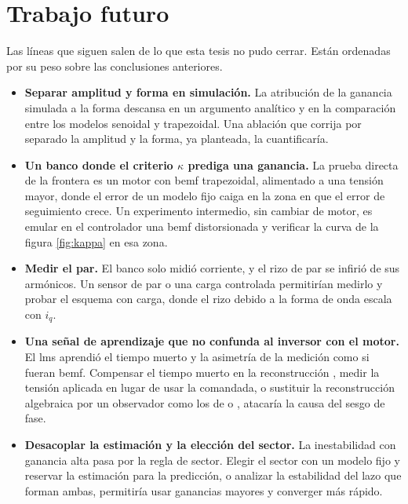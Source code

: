 \documentclass[../../../Tesis_JALS_Maestria.tex]{subfiles}
\begin{document}
\section{Trabajo futuro}
\label{sec:trabajo-futuro}

Las líneas que siguen salen de lo que esta tesis no pudo cerrar. Están ordenadas por su peso sobre las conclusiones anteriores.

\begin{itemize}
    \item \textbf{Separar amplitud y forma en simulación.} La atribución de la ganancia simulada a la forma descansa en un argumento analítico y en la comparación entre los modelos senoidal y trapezoidal. Una ablación que corrija por separado la amplitud y la forma, ya planteada, la cuantificaría.

    \item \textbf{Un banco donde el criterio $\kappa$ prediga una ganancia.} La prueba directa de la frontera es un motor con \acrshort{bemf} trapezoidal, alimentado a una tensión mayor, donde el error de un modelo fijo caiga en la zona en que el error de seguimiento crece. Un experimento intermedio, sin cambiar de motor, es emular en el controlador una \acrshort{bemf} distorsionada y verificar la curva de la figura \ref{fig:kappa} en esa zona.

    \item \textbf{Medir el par.} El banco solo midió corriente, y el rizo de par se infirió de sus armónicos. Un sensor de par o una carga controlada permitirían medirlo y probar el esquema con carga, donde el rizo debido a la forma de onda escala con $i_q$.

    \item \textbf{Una señal de aprendizaje que no confunda al inversor con el motor.} El \acrshort{lms} aprendió el tiempo muerto y la asimetría de la medición como si fueran \acrshort{bemf}. Compensar el tiempo muerto en la reconstrucción \citep{munoz1999deadtime}, medir la tensión aplicada en lugar de usar la comandada, o sustituir la reconstrucción algebraica por un observador como los de \citet{shao2019ismo} o \citet{coronado2023}, atacaría la causa del sesgo de fase.

    \item \textbf{Desacoplar la estimación y la elección del sector.} La inestabilidad con ganancia alta pasa por la regla de sector. Elegir el sector con un modelo fijo y reservar la estimación para la predicción, o analizar la estabilidad del lazo que forman ambas, permitiría usar ganancias mayores y converger más rápido.


\end{itemize}
\end{document}
